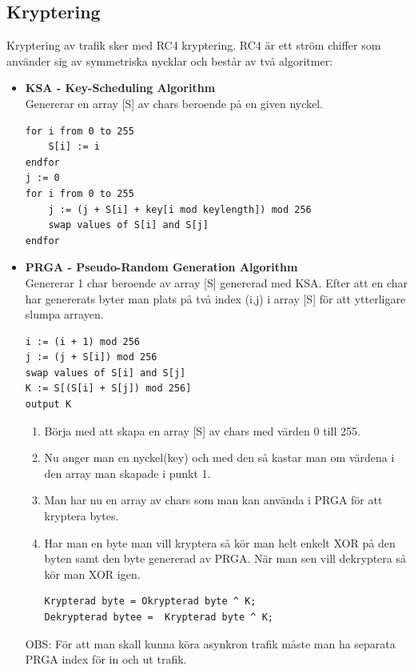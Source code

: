 \documentclass[10pt, titlepage, oneside, a4paper]{article}
\begin{document}
    	\subsection{Kryptering}
    	Kryptering av trafik sker med RC4 kryptering. RC4 är ett ström chiffer som använder sig av symmetriska nycklar och består av två algoritmer:
    	\begin{itemize}
    		\item\textbf{KSA - Key-Scheduling Algorithm}\\Genererar en array [S] av chars beroende på en given nyckel.
\begin{lstlisting}[frame = single]
for i from 0 to 255
    S[i] := i
endfor
j := 0
for i from 0 to 255
    j := (j + S[i] + key[i mod keylength]) mod 256
    swap values of S[i] and S[j]
endfor
\end{lstlisting}
    		
\item\textbf{PRGA - Pseudo-Random Generation Algorithm}\\Genererar 1 char beroende av array [S] genererad med KSA. Efter att en char har genererats byter man plats på två index (i,j) i array [S] för att ytterligare slumpa arrayen.

\begin{lstlisting}[frame = single]
i := (i + 1) mod 256
j := (j + S[i]) mod 256
swap values of S[i] and S[j]
K := S[(S[i] + S[j]) mod 256]
output K
\end{lstlisting}
    		\begin{enumerate}
    			\item Börja med att skapa en array [S] av chars med värden 0 till 255.
    			\item Nu anger man en nyckel(key) och med den så kastar man om värdena i den array man skapade i punkt 1.
    			\item Man har nu en array av chars som man kan använda i PRGA för att kryptera bytes.
    			\item Har man en byte man vill kryptera så kör man helt enkelt XOR på den byten samt den byte genererad av PRGA. När man sen vill dekryptera så kör man XOR igen.
    			\begin{lstlisting}[frame = single]
   Krypterad byte = Okrypterad byte ^ K;
Dekrypterad bytee =  Krypterad byte ^ K;
    			\end{lstlisting}
    		\end{enumerate}
    		OBS: För att man skall kunna köra asynkron trafik måste man ha separata PRGA index för in och ut trafik.

\end{itemize}
    	
\end{document}
